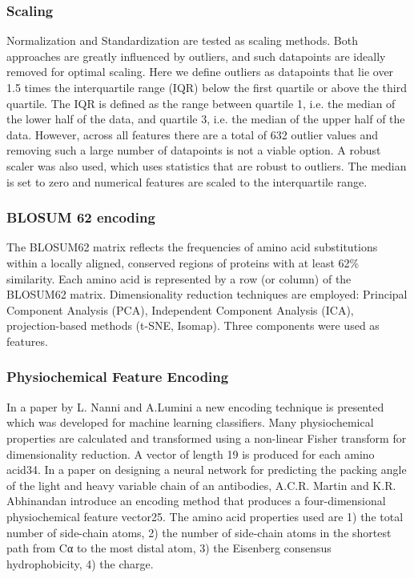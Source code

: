 \documentclass[preprint,12pt]{elsarticle}
\begin{document}
\subsubsection{Scaling} Normalization and Standardization are tested as scaling methods. Both approaches are greatly influenced by outliers, and such datapoints are ideally removed for optimal scaling. Here we define outliers as datapoints that lie over 1.5 times the interquartile range (IQR) below the first quartile or above the third quartile. The IQR is defined as the range between quartile 1, i.e. the median of the lower half of the data, and quartile 3, i.e. the median of the upper half of the 
data. However, across all features there are a total of 632 outlier values and removing such a large number of datapoints is not a viable option. A robust scaler was also used, which uses statistics that are robust to outliers. The median is set to zero and numerical features are scaled to the interquartile range. 

\subsubsection{BLOSUM 62 encoding} The BLOSUM62 matrix reflects the frequencies of amino acid substitutions within a locally aligned, conserved regions of proteins with at least 62\% similarity. Each amino acid is represented by a row (or column) of the BLOSUM62 matrix. Dimensionality reduction techniques are employed: Principal Component Analysis (PCA), Independent Component Analysis (ICA), projection-based methods (t-SNE, Isomap). Three components were used as features. 

\subsubsection{Physiochemical Feature Encoding} In a paper by L. Nanni and A.Lumini a new encoding technique is 
presented which was developed for machine learning classifiers. Many physiochemical properties are calculated and transformed using a non-linear Fisher transform for dimensionality reduction.  A vector of length 19 is produced for each amino acid34.  
In a paper on designing a neural network for predicting the packing angle of the light and heavy variable chain of an antibodies, A.C.R. Martin and K.R. Abhinandan introduce an encoding method that produces a four-dimensional physiochemical feature vector25. The amino acid properties used are 1) the total number of side-chain atoms, 2) the number of side-chain atoms in the shortest path from Cα to the most distal atom, 3) the Eisenberg consensus hydrophobicity\cite{Eisenberg1982}, 4) the charge.
\end{document}
